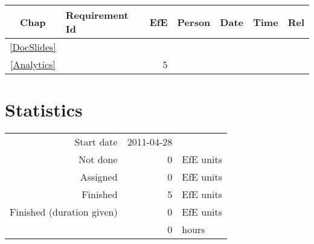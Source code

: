 {\small \begin{longtable}{|c|p{5.5cm}||r|l|l|r|r|} \hline
\textbf{Chap} & \textbf{Requirement Id} & \textbf{EfE} & \textbf{Person} & \textbf{Date} & \textbf{Time} & \textbf{Rel} \\ \hline\endhead
\ref{DocSlides} & \nameref{DocSlides} &   & \  &  & \  & \  \\ \hline
\ref{Analytics} & \nameref{Analytics} & 5 & \  &  & \  & \  \\ \hline
\end{longtable}}\section{Statistics}
\begin{longtable}{rrl}
Start date & 2011-04-28 & \\ 
Not done & 0 & EfE units \\ 
Assigned & 0 & EfE units \\ 
Finished & 5 & EfE units \\ 
Finished (duration given) & 0 & EfE units \\ 
 & 0 & hours \\ 
\end{longtable}